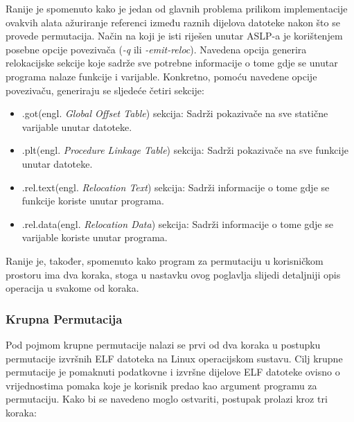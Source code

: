 \documentclass[times, utf8, diplomski, numeric]{fer}
\begin{document}
Ranije je spomenuto kako je jedan od glavnih problema prilikom
implementacije ovakvih alata ažuriranje referenci između raznih
dijelova datoteke nakon što se provede permutacija. Način na koji
je isti riješen unutar ASLP-a je korištenjem posebne opcije
povezivača (\emph{-q} ili \emph{-emit-reloc}). Navedena opcija
generira relokacijske sekcije koje sadrže sve potrebne
informacije o tome gdje se unutar programa nalaze funkcije i
varijable. Konkretno, pomoću navedene opcije povezivaču,
generiraju se sljedeće četiri sekcije:

\begin{itemize}
\item .got(engl. \emph{Global Offset Table}) sekcija: Sadrži pokazivače na sve statične varijable unutar datoteke.
\item .plt(engl. \emph{Procedure Linkage Table}) sekcija: Sadrži pokazivače na sve funkcije unutar datoteke.
\item .rel.text(engl. \emph{Relocation Text}) sekcija: Sadrži informacije o tome gdje se funkcije koriste unutar programa.
\item .rel.data(engl. \emph{Relocation Data}) sekcija: Sadrži informacije o tome gdje se varijable koriste unutar programa.
\end{itemize}

Ranije je, također, spomenuto kako program za permutaciju u
korisničkom prostoru ima dva koraka, stoga u nastavku ovog
poglavlja slijedi detaljniji opis operacija u svakome od koraka.

\subsubsection{Krupna Permutacija}

Pod pojmom krupne permutacije nalazi se prvi od dva koraka u
postupku permutacije izvršnih ELF datoteka na Linux operacijskom
sustavu. Cilj krupne permutacije je pomaknuti podatkovne i
izvršne dijelove ELF datoteke ovisno o vrijednostima pomaka koje
je korisnik predao kao argument programu za permutaciju. Kako bi
se navedeno moglo ostvariti, postupak prolazi kroz tri koraka:
\end{document}
